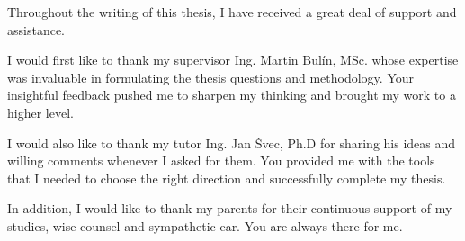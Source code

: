 
\begin{acknowledgements}
\vspace{1cm}
Throughout the writing of this thesis, I have received a great deal of support and assistance.

I would first like to thank my supervisor Ing. Martin Bulín, MSc. whose expertise was invaluable in formulating the thesis questions and methodology. Your insightful feedback pushed me to sharpen my thinking and brought my work to a higher level.

I would also like to thank my tutor Ing. Jan Švec, Ph.D for sharing his ideas and willing comments whenever I asked for them. You provided me with the tools that I needed to choose the right direction and successfully complete my thesis.

In addition, I would like to thank my parents for their continuous support of my studies, wise counsel and sympathetic ear. You are always there for me.

\end{acknowledgements}